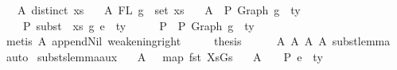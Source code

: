 \begin{isabellebody}
\ \ \ A{}{\isacharcolon}{\kern0pt}\ {\isachardoublequoteopen}distinct\ xs{\isachardoublequoteclose}\isanewline
\ \ \ A{}{\isacharcolon}{\kern0pt}\ {\isachardoublequoteopen}FL\ g\ {\isacharequal}{\kern0pt}\ set\ xs{\isachardoublequoteclose}\isanewline
\ \ \ A{}{\isacharcolon}{\kern0pt}\ {\isachardoublequoteopen}{\isacharbrackleft}{\kern0pt}{\isacharbrackright}{\kern0pt}\ {\isasymturnstile}{\isacharbraceleft}{\kern0pt}P{\isacharbraceright}{\kern0pt}\ {\isacharparenleft}{\kern0pt}Graph\ g{\isacharparenright}{\kern0pt}\ {\isacharcolon}{\kern0pt}\ ty{\isachardoublequoteclose}\isanewline
\ \ \ {\isachardoublequoteopen}{\isasymGamma}{}\ {\isasymturnstile}{\isacharbraceleft}{\kern0pt}P{\isacharbraceright}{\kern0pt}\ subst\ {}\ xs\ g\ e{}\ {\isacharcolon}{\kern0pt}\ ty{}{\isachardoublequoteclose}\isanewline
%
\isadelimproof
%
\endisadelimproof
%
\isatagproof
{}\isamarkupfalse%
\ {\isacharminus}{\kern0pt}\isanewline
\ \ \isamarkupfalse%
\ P{}{\isacharcolon}{\kern0pt}\ {\isachardoublequoteopen}{\isasymGamma}{}\ {\isasymturnstile}{\isacharbraceleft}{\kern0pt}P{\isacharbraceright}{\kern0pt}\ Graph\ g\ {\isacharcolon}{\kern0pt}\ ty{\isachardoublequoteclose}\isanewline
\ \ \ \ \isamarkupfalse%
\ {\isacharparenleft}{\kern0pt}metis\ A{}\ append{\isacharunderscore}{\kern0pt}Nil\ weakening{\isacharunderscore}{\kern0pt}right{\isacharparenright}{\kern0pt}\isanewline
\ \ \isamarkupfalse%
\ \isamarkupfalse%
\ {\isacharquery}{\kern0pt}thesis\isanewline
\ \ \ \ \isamarkupfalse%
\ A{}\ A{}\ A{}\ A{}\ subst{\isacharunderscore}{\kern0pt}lemma\ \isamarkupfalse%
\ auto\isanewline
{}\isamarkupfalse%
%
\endisatagproof
{\isafoldproof}%
%
\isadelimproof
\isanewline
%
\endisadelimproof
\isanewline
\isanewline
{}\isamarkupfalse%
\ substs{\isacharunderscore}{\kern0pt}lemma{\isacharunderscore}{\kern0pt}aux{\isacharcolon}{\kern0pt}\isanewline
\ \ \ A{}{\isacharcolon}{\kern0pt}\ {\isachardoublequoteopen}{\isasymGamma}\ {\isacharequal}{\kern0pt}\ map\ fst\ XsGs{\isachardoublequoteclose}\isanewline
\ \ \ A{}{\isacharcolon}{\kern0pt}\ {\isachardoublequoteopen}{\isasymGamma}\ {\isacharat}{\kern0pt}\ {\isasymGamma}{}\ {\isasymturnstile}{\isacharbraceleft}{\kern0pt}P{\isacharbraceright}{\kern0pt}\ e{}\ {\isacharcolon}{\kern0pt}\ ty{}{\isachardoublequoteclose}\isanewline

\end{isabellebody}
